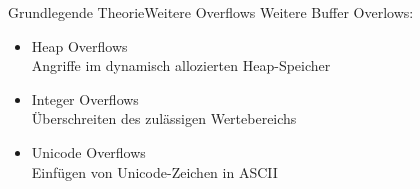 \begin{frame}{Grundlegende Theorie}{Weitere Overflows}
Weitere Buffer Overlows:
\begin{itemize}
        \vspace{1em}
        \item Heap Overflows\\ Angriffe im dynamisch allozierten Heap-Speicher
        \vspace{1em}
        \item Integer Overflows\\ Überschreiten des zulässigen Wertebereichs
        \vspace{1em}
        \item Unicode Overflows\\ Einfügen von Unicode-Zeichen in ASCII
    \end{itemize}
\end{frame}



